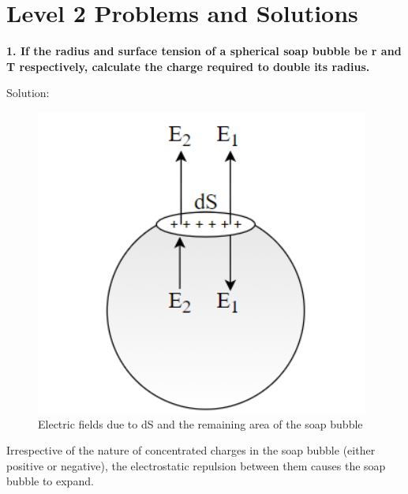 \newpage
\section{Level 2 Problems and Solutions}
\begin{tcolorbox}
\textbf{1. If the radius and surface tension of a spherical soap bubble be r and T respectively, calculate the charge required to double its radius.} 
\end{tcolorbox}
 Solution:
\begin{figure}[h]
    \centering
    \includegraphics[scale = 0.5]{figures/Sandesh's Figures/fig1.png}
    \caption{
 Electric fields due to dS and the remaining area of the soap bubble }
    \label{fig1}
\end{figure}

 Irrespective of the nature of concentrated charges in the soap bubble (either positive or negative), the electrostatic repulsion between them causes the soap bubble to expand.\\


